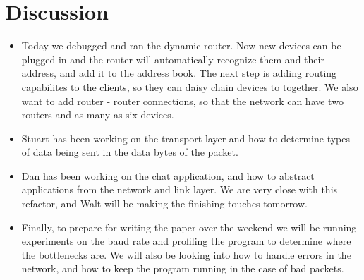 \documentclass{article}
\begin{document}
\section*{Discussion}
\begin{itemize}
    \item Today we debugged and ran the dynamic router. Now new devices can be plugged in and the router will automatically recognize them and their address, 
    and add it to the address book. The next step is adding routing capabilites to the clients, so they can daisy chain devices to together. 
    We also want to add router - router connections, so that the network can have two routers and as many as six devices. 
    \item Stuart has been working on the transport layer and how to determine types of data being sent in the data bytes of the packet.
    \item Dan has been working on the chat application, and how to abstract applications from the network and link layer. We are very close with
    this refactor, and Walt will be making the finishing touches tomorrow.
    \item Finally, to prepare for writing the paper over the weekend we will be running experiments on the baud rate and profiling the program to determine
    where the bottlenecks are. We will also be looking into how to handle errors in the network, and how to keep the program running in the case of bad packets.
\end{itemize}

\end{document}
